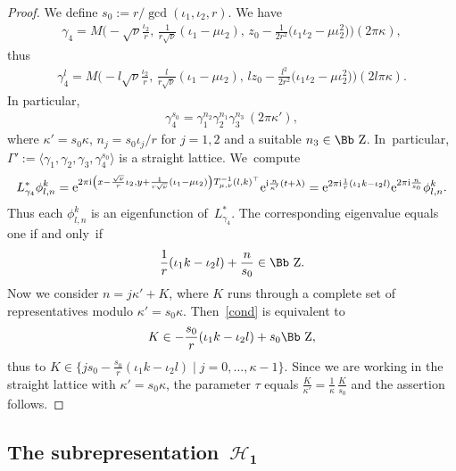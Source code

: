 \documentclass[pdftex]{sigma}
\newcommand\ZZ{{\mbox{\Bb Z}}}
\newcommand\cH{{\mathcal H}}
\newcommand\la{\langle}
\newcommand\ra{\rangle}
\numberwithin{equation}{section}
\begin{document}
\begin{proof} We define $s_0:=r/\gcd(\iota_1,\iota_2,r)$.
We have
\begin{gather*}
\gamma_4=M\bigg({-}\sqrt\nu\frac{\iota_2}{r},\,\frac{1}{r\sqrt\nu}(\iota_1-\mu\iota_2), \, z_0-\frac{1}{2r^2}\big(\iota_1\iota_2-\mu\iota_2^2\big)\bigg)(2\pi\kappa),
\end{gather*}
thus
\begin{gather*}
\gamma_4^l=M\bigg({-}l\sqrt\nu\frac{\iota_2}{r},\,\frac{l}{r\sqrt\nu}(\iota_1-\mu\iota_2),\, lz_0-\frac{l^2}{2r^2}\big(\iota_1\iota_2-\mu\iota_2^2\big)\bigg)(2l\pi\kappa).
\end{gather*}
In particular,
\begin{gather*}
\gamma_4^{s_0}=\gamma_1^{n_2}\gamma_2^{n_1}\gamma_3^{n_3}\,(2\pi\kappa'),
\end{gather*}
where $\kappa'=s_0\kappa$, $n_j=s_0\iota_j/r$ for $j=1,2$ and a suitable $n_3\in\ZZ$. In~particular, $\Gamma':=\la \gamma_1, \gamma_2, \gamma_3, \gamma_4^{s_0}\ra$ is a straight lattice. We~compute
\begin{gather*}
L_{\gamma_4}^* \phi^k_{l,n}= {\rm e}^{2\pi {\rm i}\left(x-\frac{\sqrt\nu}r\iota_2,y+\frac 1{r\sqrt\nu}(\iota_1-\mu \iota_2)\right)T_{\mu,\nu}^{-1}( l,k)^\top}{\rm e}^{{\rm i} \frac n{\kappa'} ( t+\lambda)}
= {\rm e}^{2\pi {\rm i} \frac 1r(\iota_1k-\iota_2l)} {\rm e}^{2\pi {\rm i} \frac n{s_0}} \phi^k_{l,n}.
\end{gather*}
Thus each $\phi^k_{l,n}$ is an eigenfunction of~$L_{\gamma_4}^*$. The corresponding eigenvalue equals one if and only~if
\begin{gather}\label{cond}
\frac1r(\iota_1k-\iota_2l)+\frac n{s_0}\in\ZZ.
\end{gather}
Now we consider $n=j\kappa'+K$, where $K$ runs through a complete set of representatives modulo $\kappa'=s_0\kappa$. Then~\eqref{cond} is equivalent to
\begin{gather*}
 K\in -\frac{s_0}r(\iota_1k-\iota_2l)+s_0\ZZ,
 \end{gather*}
thus to $K\in\big\{js_0-\frac{s_0}r(\iota_1k-\iota_2l)\mid j=0,\dots,\kappa-1\big\}$. Since we are working in the straight lattice with $\kappa'=s_0\kappa$, the parameter $\tau$ equals $\frac K{\kappa'}=\frac 1\kappa \, \frac K{s_0}$ and the assertion follows.
\end{proof}
%
\subsection[The subrepresentation~$\cH_1$]{The subrepresentation~$\boldsymbol{\cH_1}$}
\end{document}
